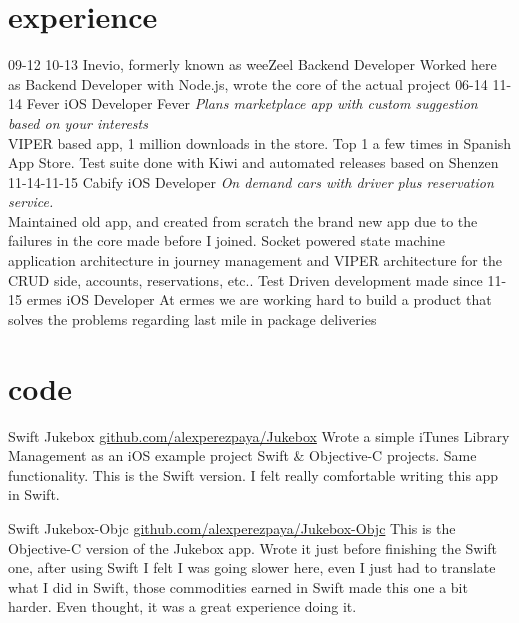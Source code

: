 \documentclass[]{perezpaya-cv}
\begin{document}
\section{experience}

\begin{entrylist}
  \entry
    {09-12 10-13}
    {Inevio, formerly known as weeZeel}
    {Backend Developer}
    {Worked here as Backend Developer with Node.js, wrote the core of the actual project}
  \entry
    {06-14 11-14}
    {Fever}
    {iOS Developer}
    {Fever \emph{Plans marketplace app with custom suggestion based on your interests} \\VIPER based app, 1 million downloads in the store. Top 1 a few times in Spanish App Store. Test suite done with Kiwi and automated releases based on Shenzen}
  \entry
    {11-14-11-15}
    {Cabify}
    {iOS Developer}
    {\emph{On demand cars with driver plus reservation service.}
    \\Maintained old app, and created from scratch the brand new app due to the failures in the core made before I joined. Socket powered state machine application architecture in journey management and VIPER architecture for the CRUD side, accounts, reservations, etc.. Test Driven development made}
  \entry
    {since 11-15}
    {ermes}
    {iOS Developer}
    {At ermes we are working hard to build a product that solves the problems regarding last mile in package deliveries}
\end{entrylist}

\section{code}
\begin{entrylist}
\entry
    {Swift}
    {Jukebox}
    {\href{http://github.com/alexperezpaya/Jukebox}{github.com/alexperezpaya/Jukebox}}
    {Wrote a simple iTunes Library Management as an iOS example project
Swift \& Objective-C projects. Same functionality. This is the Swift version. I felt really comfortable writing this app in Swift.}

\entry
    {Swift}
    {Jukebox-Objc}
    {\href{http://github.com/alexperezpaya/Jukebox-Objc}{github.com/alexperezpaya/Jukebox-Objc}}
    {This is the Objective-C version of the Jukebox app. Wrote it just before finishing the Swift one, after using Swift I felt I was going slower here, even I just had to translate what I did in Swift, those commodities earned in Swift made this one a bit harder. Even thought, it was a great experience doing it.}

\end{entrylist}
\end{document}
